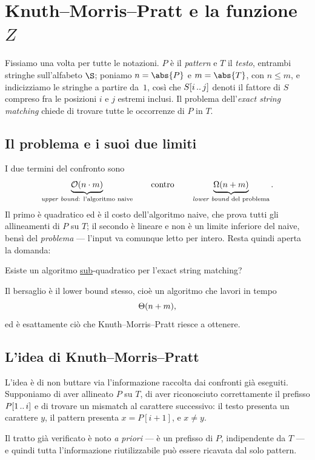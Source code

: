 \chapter{Knuth--Morris--Pratt e la funzione \texorpdfstring{$Z$}{Z}}
\label{cap:kmp-z}

Fissiamo una volta per tutte le notazioni. $P$ è il \emph{pattern} e $T$ il
\emph{testo}, entrambi stringhe sull'alfabeto $\alfa$; poniamo $n=\abs{P}$ e
$m=\abs{T}$, con $n\le m$, e indicizziamo le stringhe a partire da~$1$, così che
$S[i\,..\,j]$ denoti il fattore di $S$ compreso fra le posizioni $i$ e $j$
estremi inclusi. Il problema dell'\emph{exact string matching} chiede di trovare
tutte le occorrenze di $P$ in $T$.

\section{Il problema e i suoi due limiti}

I due termini del confronto sono
\[
  \underbrace{\mathcal{O}(n\cdot m)}_{\text{\emph{upper bound}: l'algoritmo naive}}
  \qquad\text{contro}\qquad
  \underbrace{\Omega(n+m)}_{\text{\emph{lower bound} del problema}} .
\]
Il primo è quadratico ed è il costo dell'algoritmo naive, che prova tutti gli
allineamenti di $P$ su $T$; il secondo è lineare e non è un limite inferiore del
naive, bensì del \emph{problema} --- l'input va comunque letto per intero. Resta
quindi aperta la domanda:

\begin{domanda}\label{dom:subquadratico}
  Esiste un algoritmo \underline{sub}-quadratico per l'exact string matching?
\end{domanda}

\noindent Il bersaglio è il lower bound stesso, cioè un algoritmo che lavori in
tempo
\[
  \Theta(n+m),
\]
ed è esattamente ciò che Knuth--Morris--Pratt riesce a ottenere.

\section{L'idea di Knuth--Morris--Pratt}

L'idea è di non buttare via l'informazione raccolta dai confronti già eseguiti.
Supponiamo di aver allineato $P$ su $T$, di aver riconosciuto correttamente il
prefisso $P[1\,..\,i]$ e di trovare un mismatch al carattere successivo: il testo
presenta un carattere $y$, il pattern presenta $x=P[i+1]$, e $x\neq y$.

Il tratto già verificato è noto \emph{a priori} --- è un prefisso di $P$,
indipendente da $T$ --- e quindi tutta l'informazione riutilizzabile può essere
ricavata dal solo pattern.

